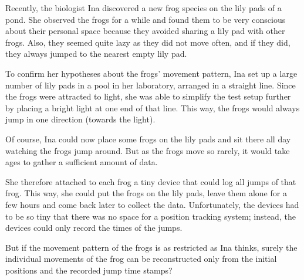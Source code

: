 
\newcommand{\frogsprotagonist}{Ina}

%
Recently, the biologist \frogsprotagonist{} discovered a new frog species
on the lily pads of a pond.
She observed the frogs for a while and found them to be very conscious
about their personal space because they avoided sharing a lily pad with other frogs.
Also, they seemed quite lazy as they did not move often, and if they did,
they always jumped to the nearest empty lily pad.

To confirm her hypotheses about the frogs' movement pattern, \frogsprotagonist{} set up
a large number of lily pads in a pool in her laboratory, arranged in a straight line.
Since the frogs were attracted to light, she was able to simplify the test setup
further by placing a bright light at one end of that line. This way, the frogs
would always jump in one direction (towards the light).

Of course, \frogsprotagonist{} could now place some frogs on the lily pads and
sit there all day watching the frogs jump around. But as the frogs
move so rarely, it would take ages to gather a sufficient amount of data.

She therefore attached to each frog a tiny device that could log all jumps of that frog.
This way, she could put the frogs on the lily pads, leave
them alone for a few hours and come back later to collect the data.
Unfortunately, the devices had to be so tiny that there was no space
for a position tracking system; instead, the devices could only record the times of the jumps.

But if the movement pattern of the frogs is as restricted as \frogsprotagonist{} thinks, surely the
individual movements of the frog can be reconstructed only from the initial positions and
the recorded jump time stamps?

